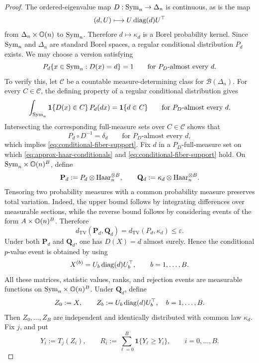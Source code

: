 \begin{proof}
The ordered-eigenvalue map \(D:\mathrm{Sym}_n\to\Delta_n\) is continuous, as
is the map
\[
(d,U)\longmapsto U\operatorname{diag}(d)U^\top
\]
from \(\Delta_n\times\mathbb{O}(n)\) to \(\mathrm{Sym}_n\). Therefore
\(d\mapsto\kappa_d\) is a Borel probability kernel. Since
\(\mathrm{Sym}_n\) and \(\Delta_n\) are standard Borel spaces, a regular
conditional distribution \(P_d\) exists.
We may choose a version satisfying
\begin{equation}
\label{eq:conditional-fiber-support}
P_d\{x\in\mathrm{Sym}_n:D(x)=d\}=1
\qquad
\text{for \(P_D\)-almost every \(d\)}.
\end{equation}
To verify this, let \(\mathcal C\) be a countable
measure-determining class for \(\mathcal B(\Delta_n)\). For every
\(C\in\mathcal C\), the defining property of a regular conditional
distribution gives
\[
\int_{\mathrm{Sym}_n}
\mathbf 1\{D(x)\in C\}\,P_d(dx)
=
\mathbf 1\{d\in C\}
\qquad
\text{for \(P_D\)-almost every \(d\)}.
\]
Intersecting the corresponding full-measure sets over
\(C\in\mathcal C\) shows that
\[
P_d\circ D^{-1}=\delta_d
\qquad
\text{for \(P_D\)-almost every \(d\)},
\]
which implies \eqref{eq:conditional-fiber-support}.
Fix \(d\) in a \(P_D\)-full-measure set on which
\eqref{eq:approx-haar-conditionals} and
\eqref{eq:conditional-fiber-support} hold. On
\(\mathrm{Sym}_n\times\mathbb{O}(n)^B\), define
\[
\mathbf P_d
:=
P_d\otimes\mathrm{Haar}_n^{\otimes B},
\qquad
\mathbf Q_d
:=
\kappa_d\otimes\mathrm{Haar}_n^{\otimes B}.
\]
Tensoring two probability measures with a common probability measure
preserves total variation. Indeed, the upper bound follows by
integrating differences over measurable sections, while the reverse
bound follows by considering events of the form
\(A\times\mathbb{O}(n)^B\). Therefore
\begin{equation}
\label{eq:conditional-product-tv}
d_{\mathrm{TV}}(\mathbf P_d,\mathbf Q_d)
=
d_{\mathrm{TV}}(P_d,\kappa_d)
\leq\varepsilon.
\end{equation}
Under both \(\mathbf P_d\) and \(\mathbf Q_d\), one has \(D(X)=d\)
almost surely. Hence the conditional \(p\)-value event is obtained by
using
\[
X^{(b)}=U_b\operatorname{diag}(d)U_b^\top,
\qquad b=1,\ldots,B.
\]
All these matrices, statistic values, ranks, and rejection events are
measurable functions on \(\mathrm{Sym}_n\times\mathbb{O}(n)^B\).
Under \(\mathbf Q_d\), define
\[
Z_0:=X,
\qquad
Z_b:=U_b\operatorname{diag}(d)U_b^\top,
\quad b=1,\ldots,B.
\]
Then \(Z_0,\ldots,Z_B\) are independent and identically distributed
with common law \(\kappa_d\). Fix \(j\), and put
\[
Y_i:=T_j(Z_i),
\qquad
R_i
:=
\sum_{\ell=0}^{B}\mathbf 1\{Y_\ell\geq Y_i\},
\qquad
i=0,\ldots,B.
\]
\end{proof}

